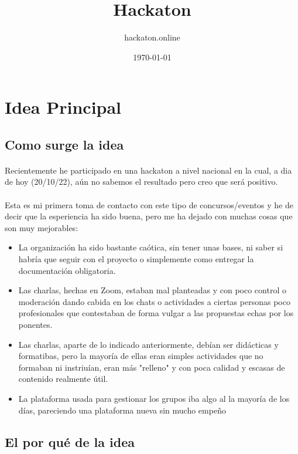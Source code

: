 \documentclass[a4paper]{article}
\author{hackaton.online}
\title{Hackaton}
\date{\today}
\begin{document}
    \maketitle
    \tableofcontents
    \section[Idea]{Idea Principal}
    \subsection[Inicio]{Como surge la idea}
    \paragraph{}
    Recientemente he participado en una hackaton a nivel nacional
    en la cual, a dia de hoy (20/10/22), aún no sabemos el resultado 
    pero creo que será positivo.
    \paragraph{}
    Esta es mi primera toma de contacto con este tipo de concursos/eventos
    y he de decir que la esperiencia ha sido buena, pero me ha dejado con 
    muchas cosas que son muy mejorables:
    \begin{itemize}
        \item La organización ha sido bastante caótica, sin tener unas bases, 
        ni saber si habría que seguir con el proyecto o simplemente como entregar 
        la documentación obligatoria.
        \item Las charlas, hechas en Zoom, estaban mal planteadas y con poco control o moderación 
        dando cabida en los chats o actividades a ciertas personas poco profesionales
        que contestaban de forma vulgar a las propuestas echas por los ponentes.
        \item Las charlas, aparte de lo indicado anteriormente, debían ser didácticas 
        y formatibas, pero la mayoría de ellas eran simples actividades que no formaban ni
        instriuían, eran más "relleno" y con poca calidad y escasas de contenido realmente 
        útil.
        \item La plataforma usada para gestionar los grupos iba algo al la mayoría de los 
        días, pareciendo una plataforma nueva sin mucho empeño
    \end{itemize}
    \subsection[¿Por que?]{El por qué de la idea}
\end{document}
